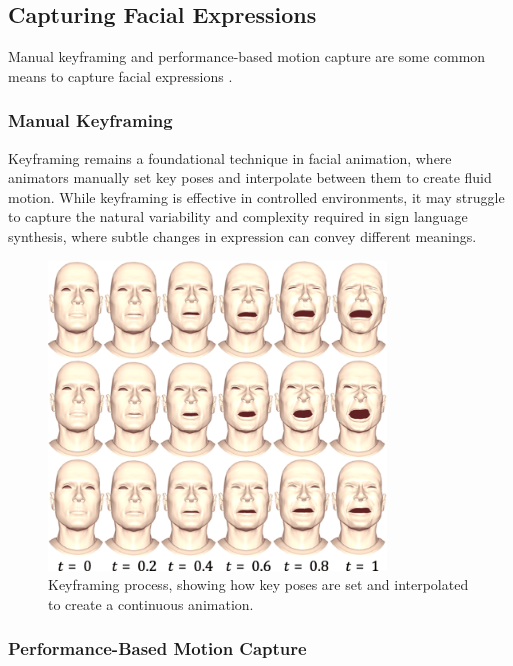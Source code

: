 \documentclass[../../main]{subfiles}
\begin{document}
\subsection{Capturing Facial Expressions}
\label{ch:facial_expressions:related_work:face_rigging:capture}

Manual keyframing and performance-based motion capture are some common means to capture facial expressions .

\subsubsection{Manual Keyframing}
\label{ch:facial_expressions:related_work:face_rigging:capture:manual_keyframing}

Keyframing remains a foundational technique in facial animation, where animators manually set key poses and interpolate between them to create fluid motion. While keyframing is effective in controlled environments, it may struggle to capture the natural variability and complexity required in sign language synthesis, where subtle changes in expression can convey different meanings.

\begin{figure}
    \centering
    \includegraphics[width=0.8\textwidth]{chapters/facial_expressions/images/keyframing.png}
    \caption{Keyframing process, showing how key poses are set and interpolated to create a continuous animation.}
    \label{ch:facial_expressions:fig:keyframing}
\end{figure}

\subsubsection{Performance-Based Motion Capture}
\label{ch:facial_expressions:related_work:face_rigging:capture:performance_based_motion_capture}
\end{document}
